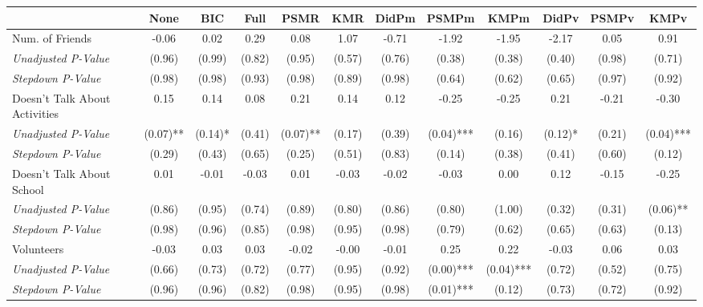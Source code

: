 \begin{tabular}{l c c c c c c c c c c c}
\toprule
 & None & BIC & Full & PSMR & KMR & DidPm & PSMPm & KMPm & DidPv & PSMPv & KMPv \\
\midrule
Num. of Friends & -0.06 & 0.02 & 0.29 & 0.08 & 1.07 & -0.71 & -1.92 & -1.95 & -2.17 & 0.05 & 0.91 \\
\quad \textit{Unadjusted P-Value} & (0.96) & (0.99) & (0.82) & (0.95) & (0.57) & (0.76) & (0.38) & (0.38) & (0.40) & (0.98) & (0.71) \\
\quad \textit{Stepdown P-Value} & (0.98) & (0.98) & (0.93) & (0.98) & (0.89) & (0.98) & (0.64) & (0.62) & (0.65) & (0.97) & (0.92) \\
Doesn't Talk About Activities & 0.15 & 0.14 & 0.08 & 0.21 & 0.14 & 0.12 & -0.25 & -0.25 & 0.21 & -0.21 & -0.30 \\
\quad \textit{Unadjusted P-Value} & (0.07)** & (0.14)* & (0.41) & (0.07)** & (0.17) & (0.39) & (0.04)*** & (0.16) & (0.12)* & (0.21) & (0.04)*** \\
\quad \textit{Stepdown P-Value} & (0.29) & (0.43) & (0.65) & (0.25) & (0.51) & (0.83) & (0.14) & (0.38) & (0.41) & (0.60) & (0.12) \\
Doesn't Talk About School & 0.01 & -0.01 & -0.03 & 0.01 & -0.03 & -0.02 & -0.03 & 0.00 & 0.12 & -0.15 & -0.25 \\
\quad \textit{Unadjusted P-Value} & (0.86) & (0.95) & (0.74) & (0.89) & (0.80) & (0.86) & (0.80) & (1.00) & (0.32) & (0.31) & (0.06)** \\
\quad \textit{Stepdown P-Value} & (0.98) & (0.96) & (0.85) & (0.98) & (0.95) & (0.98) & (0.79) & (0.62) & (0.65) & (0.63) & (0.13) \\
Volunteers & -0.03 & 0.03 & 0.03 & -0.02 & -0.00 & -0.01 & 0.25 & 0.22 & -0.03 & 0.06 & 0.03 \\
\quad \textit{Unadjusted P-Value} & (0.66) & (0.73) & (0.72) & (0.77) & (0.95) & (0.92) & (0.00)*** & (0.04)*** & (0.72) & (0.52) & (0.75) \\
\quad \textit{Stepdown P-Value} & (0.96) & (0.96) & (0.82) & (0.98) & (0.95) & (0.98) & (0.01)*** & (0.12) & (0.73) & (0.72) & (0.92) \\
\bottomrule
\end{tabular}
